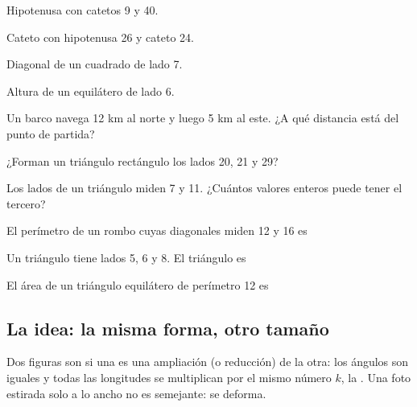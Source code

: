 \taller
{}
\begin{ejercicios}[2]
\item Hipotenusa con catetos 9 y 40. 
\item Cateto con hipotenusa 26 y cateto 24. 
\item Diagonal de un cuadrado de lado 7. 
\item Altura de un equilátero de lado 6. 
\end{ejercicios}
\begin{ejercicios}
\item Un barco navega 12 km al norte y luego 5 km al este. ¿A qué distancia está del punto de partida? 
\item ¿Forman un triángulo rectángulo los lados 20, 21 y 29? 
\item Los lados de un triángulo miden 7 y 11. ¿Cuántos valores enteros puede tener el tercero? 
\end{ejercicios}
\begin{ejercicios}
\item El perímetro de un rombo cuyas diagonales miden 12 y 16 es
\item Un triángulo tiene lados 5, 6 y 8. El triángulo es
\item El área de un triángulo equilátero de perímetro 12 es
\end{ejercicios}

\bitacora


\subsection{La idea: la misma forma, otro tamaño}
Dos figuras son  si una es una ampliación (o reducción) de la otra: los ángulos son iguales y todas
las longitudes se multiplican por el mismo número $k$, la . Una foto estirada solo a lo ancho
no es semejante: se deforma.

